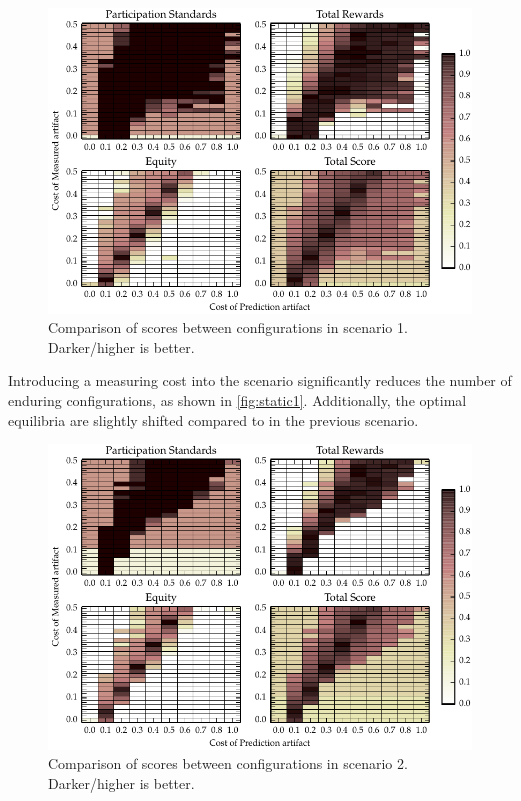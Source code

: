 \begin{figure}
\includegraphics{gfx/kc/static_0.pdf} 
\caption[Comparison of scores between configurations in scenario 1.]{Comparison of scores between configurations in scenario 1. Darker/higher is better.}\label{fig:static0}
\end{figure}

Introducing a measuring cost into the scenario significantly reduces the
number of enduring configurations, as shown in \autoref{fig:static1}.
Additionally, the optimal equilibria are slightly shifted compared to in the
previous scenario.

\begin{figure}
\includegraphics{gfx/kc/static_1.pdf} 
\caption[Comparison of scores between configurations in scenario 2.]{Comparison of scores between configurations in scenario 2. Darker/higher is better.}\label{fig:static1}
\end{figure}

